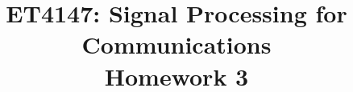 \documentclass[conference]{IEEEtran}
\begin{document}
\title{ET4147: Signal Processing for Communications\\
    \large Homework 3}
\author{
  \and
}
\maketitle


\listoftodos









\nocite{*}




\end{document}
